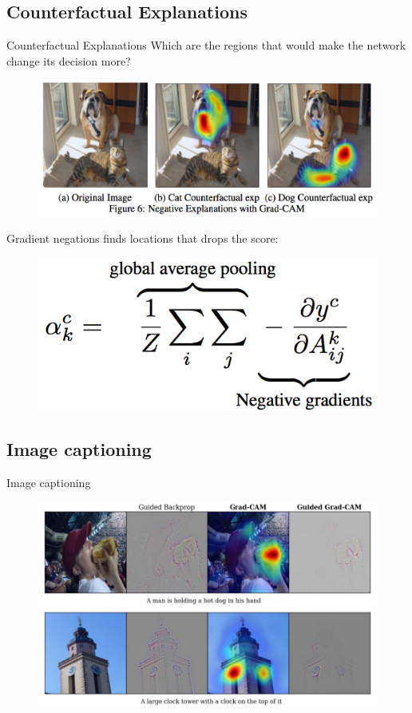 \documentclass[11pt]{beamer}
\begin{document}
\subsection{Counterfactual Explanations}
\begin{frame}{Counterfactual Explanations}
Which are the regions that would make the network change
its decision more?
\begin{figure}
    \includegraphics[width=1.05\textwidth]{g7.png}
\end{figure}
Gradient negations finds locations that drops the score:
\begin{figure}
    \includegraphics[width=.35\textwidth]{g8.png}
\end{figure}
\end{frame}

\subsection{Image captioning}
\begin{frame}{Image captioning}
\begin{figure}
    \includegraphics[width=1.05\textwidth]{g9.png}
\end{figure}
\end{frame}
\end{document}
